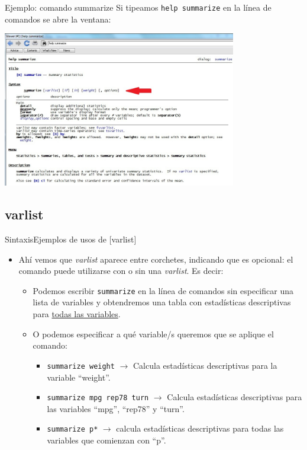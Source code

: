 \documentclass{beamer}
\begin{document}
\begin{frame}{Ejemplo: comando summarize}{}
{\footnotesize Si tipeamos \texttt{help summarize} en la línea de comandos se abre la ventana:}
\centerline{\includegraphics[height=6.8cm]{summ.jpg}}
\end{frame}
\subsection{varlist}
\begin{frame}{Sintaxis}{Ejemplos de usos de [varlist]}
\begin{itemize}
\item Ahí vemos que \textit{varlist} aparece entre corchetes, indicando que es opcional: el comando puede utilizarse con o sin una \textit{varlist}. Es decir:
\begin{itemize}
\item Podemos escribir \texttt{summarize} en la línea de comandos sin especificar una lista de variables y obtendremos una tabla con estadísticas descriptivas para \underline{todas las variables}.  
\item O podemos especificar a qué variable/s queremos que se aplique el comando:
\begin{itemize} 
\item  \texttt{summarize weight} \hspace{0.3 cm} $\rightarrow$  Calcula estadísticas descriptivas para la variable ``weight''.
\item \texttt{summarize mpg rep78 turn} \hspace{0.3 cm} $\rightarrow$  Calcula estadísticas descriptivas para las variables ``mpg'', ``rep78'' y ``turn''.
\item  \texttt{summarize p*}  \hspace{0.3 cm} $\rightarrow$ calcula estadísticas descriptivas para todas las variables que comienzan con ``p''. 
\end{itemize}
\end{itemize}
\end{itemize}
\end{frame}
\end{document}
